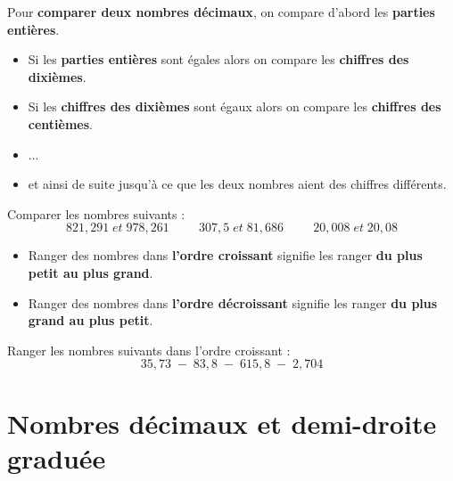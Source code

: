 \documentclass[a4paper,dvipsnames]{article}
\begin{document}
\begin{Mt}
Pour \textbf{comparer deux nombres décimaux}, on compare d'abord les \textbf{parties entières}.
\begin{itemize}
\item Si les \textbf{parties entières} sont égales alors on compare les \textbf{chiffres des dixièmes}.
\item Si les \textbf{chiffres des dixièmes} sont égaux alors on compare les \textbf{chiffres des centièmes}.
\item ...
\item et ainsi de suite jusqu'à ce que les deux nombres aient des chiffres différents.
\end{itemize}
\end{Mt}

\begin{ExOApp}[]
Comparer les nombres suivants :
\[821,291\;et\;978,261\hspace{1cm}307,5\;et\;81,686\hspace{1cm}20,008\;et\;20,08\]
\end{ExOApp}

\begin{Def}
\begin{itemize}
\item Ranger des nombres dans \textbf{l'ordre croissant} signifie les ranger \textbf{du plus petit au plus grand}.
\item Ranger des nombres dans \textbf{l'ordre décroissant} signifie les ranger \textbf{du plus grand au plus petit}.
\end{itemize}
\end{Def}

\begin{ExOApp}[]
Ranger les nombres suivants dans l'ordre croissant :
\[35,73\;-\;83,8\;-\;615,8\;-\;2,704\]
\end{ExOApp}

\section{Nombres décimaux et demi-droite graduée}
\end{document}
